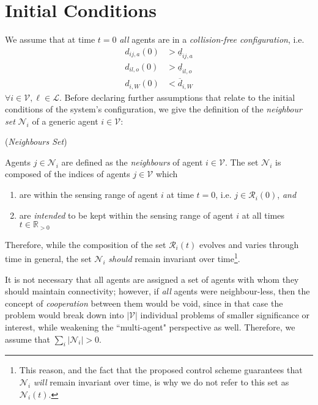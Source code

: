\section{Initial Conditions}

We assume that at time $t=0$ \textit{all} agents are in a
\textit{collision-free configuration}, i.e.
\begin{subequations}
\begin{align}
    d_{ij,a}(0) &> \underline{d}_{ij,a} \\[2.5ex]
    d_{il,o}(0) &> \underline{d}_{il,o} \\[2.5ex]
    d_{i,W}(0)  &< \overline{d}_{i,W}
\label{eq:initially_coll_free}
\end{align}
\end{subequations}
$\forall i \in \mathcal{V}, \ell \in \mathcal{L}$. Before declaring further
assumptions that relate to the initial conditions of the system's configuration,
we give the definition of the \textit{neighbour set} $\mathcal{N}_i$ of a
generic agent $i \in \mathcal{V}$:
\begin{bw_box}
\begin{definition} (\textit{Neighbours Set})

Agents $j \in \mathcal{N}_i$ are defined as the \textit{neighbours} of
agent $i \in \mathcal{V}$. The set $\mathcal{N}_i$ is composed of the
indices of agents $j \in \mathcal{V}$ which
\begin{enumerate}
  \item are within the sensing range of agent $i$ at time $t=0$, i.e.
    $j \in \mathcal{R}_i(0)$, \textit{and}
  \item are \textit{intended} to be kept within the sensing range of agent $i$ at all
    times $t \in \mathbb{R}_{> 0}$
\end{enumerate}
\end{definition}
\end{bw_box}

Therefore, while the composition of the set $\mathcal{R}_i(t)$ evolves and
varies through time in general, the set $\mathcal{N}_i$ \textit{should} remain
invariant over time\footnote{This reason, and the fact that the proposed
control scheme guarantees that $\mathcal{N}_i$ \textit{will} remain invariant
over time, is why we do not refer to this set as $\mathcal{N}_i(t)$.}.

It is not necessary that all agents are assigned a set of agents with whom they
should maintain connectivity; however, if \textit{all} agents were
neighbour-less, then the concept of \textit{cooperation} between them would be
void, since in that case the problem would break down into $|\mathcal{V}|$
individual problems of smaller significance or interest, while weakening the
``multi-agent" perspective as well. Therefore, we assume that
$\sum\limits_i |\mathcal{N}_i| > 0$.

